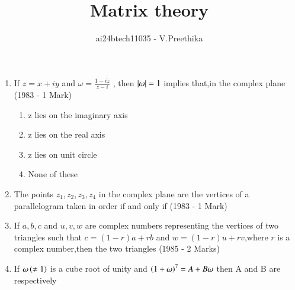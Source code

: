 \documentclass[journal,12pt,twocolumn]{IEEEtran}
\theoremstyle{remark}
\begin{document}

\vspace{3cm}

\title{Matrix theory}
\author{ai24btech11035 - V.Preethika}
\maketitle
\newpage
\bigskip

\renewcommand{\thefigure}{\theenumi}
\renewcommand{\thetable}{\theenumi}

\begin{enumerate}[start=6]
\item If $z=x+iy$ and $\omega=\frac{1-iz}{z-i}$ , then $\left\vert\omega\right\vert=1$ implies that,in the complex plane
\hfill{(1983 - 1 Mark)}
\begin{enumerate}
\item z lies on the imaginary axis
\item z lies on the real axis
\item z lies on unit circle
\item None of these
\end{enumerate}
\item The points $z_1,z_2,z_3,z_4$ in the complex plane are the vertices of a parallelogram taken in order if and only if
\hfill{(1983 - 1 Mark)}
\begin{enumerate}
\end{enumerate}
\item If $a,b,c$ and $u,v,w$ are complex numbers representing the vertices of two triangles such that $c=(1-r)a+rb$ and $w=(1-r)u+rv$,where $r$ is a complex number,then the two triangles
\hfill{(1985 - 2 Marks)}
\begin{enumerate}
\end{enumerate}
\item If $\omega\left(\neq1\right)$ is a cube root of unity and $\left(1+\omega\right)^7=A+B\omega$ then A and B are respectively

\end{enumerate}
\end{document}
